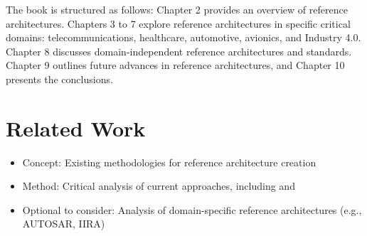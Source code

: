 \documentclass[12pt,a4paper]{article}
\begin{document}


The book is structured as follows: Chapter 2 provides an overview of reference architectures. Chapters 3 to 7 explore reference architectures in specific critical domains: telecommunications, healthcare, automotive, avionics, and Industry 4.0. Chapter 8 discusses domain-independent reference architectures and standards. Chapter 9 outlines future advances in reference architectures, and Chapter 10 presents the conclusions.

\section{Related Work}
\begin{itemize}
    \item Concept: Existing methodologies for reference architecture creation
    \item Method: Critical analysis of current approaches, including \citet{Galster2011} and \citet{Nakagawa2014}
    \item Optional to consider: Analysis of domain-specific reference architectures (e.g., AUTOSAR, IIRA) \citep{Nakagawa2023}
\end{itemize}
\end{document}
